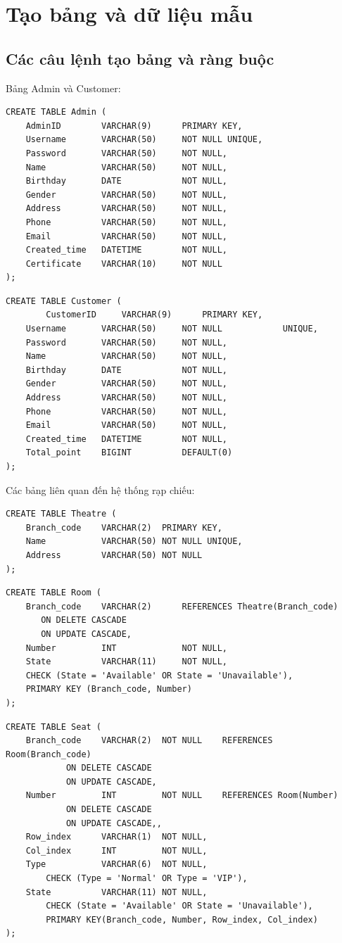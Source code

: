 \section{Tạo bảng và dữ liệu mẫu}
\subsection{Các câu lệnh tạo bảng và ràng buộc}
Bảng Admin và Customer:
\begin{verbatim}
CREATE TABLE Admin (
	AdminID        VARCHAR(9)      PRIMARY KEY,
	Username       VARCHAR(50)     NOT NULL	UNIQUE,
	Password       VARCHAR(50)     NOT NULL,
	Name           VARCHAR(50)     NOT NULL,
	Birthday       DATE            NOT NULL,
	Gender         VARCHAR(50)     NOT NULL,
	Address        VARCHAR(50)     NOT NULL,
	Phone          VARCHAR(50)     NOT NULL,
	Email          VARCHAR(50)     NOT NULL,
	Created_time   DATETIME        NOT NULL,
	Certificate    VARCHAR(10)     NOT NULL
);
\end{verbatim}
\begin{verbatim}
CREATE TABLE Customer (
        CustomerID     VARCHAR(9)      PRIMARY KEY,
	Username       VARCHAR(50)     NOT NULL            UNIQUE,
	Password       VARCHAR(50)     NOT NULL,
	Name           VARCHAR(50)     NOT NULL,
	Birthday       DATE            NOT NULL,
	Gender         VARCHAR(50)     NOT NULL,
	Address        VARCHAR(50)     NOT NULL,
	Phone          VARCHAR(50)     NOT NULL,
	Email          VARCHAR(50)     NOT NULL,
	Created_time   DATETIME        NOT NULL,
	Total_point    BIGINT          DEFAULT(0) 
);
\end{verbatim}
Các bảng liên quan đến hệ thống rạp chiếu:
\begin{verbatim}
CREATE TABLE Theatre (
	Branch_code    VARCHAR(2)  PRIMARY KEY,
	Name           VARCHAR(50) NOT NULL UNIQUE,
	Address        VARCHAR(50) NOT NULL
);
\end{verbatim}
\begin{verbatim}
CREATE TABLE Room (
	Branch_code    VARCHAR(2)      REFERENCES Theatre(Branch_code)
	   ON DELETE CASCADE
	   ON UPDATE CASCADE,
	Number         INT             NOT NULL,
	State          VARCHAR(11)     NOT NULL,
	CHECK (State = 'Available' OR State = 'Unavailable'),
	PRIMARY KEY (Branch_code, Number)
);
\end{verbatim}
\begin{verbatim}
CREATE TABLE Seat (
	Branch_code    VARCHAR(2)  NOT NULL    REFERENCES Room(Branch_code)
            ON DELETE CASCADE
            ON UPDATE CASCADE,
	Number         INT         NOT NULL    REFERENCES Room(Number)
            ON DELETE CASCADE
            ON UPDATE CASCADE,,
	Row_index      VARCHAR(1)  NOT NULL,
	Col_index      INT         NOT NULL,
	Type           VARCHAR(6)  NOT NULL,
        CHECK (Type = 'Normal' OR Type = 'VIP'),
	State          VARCHAR(11) NOT NULL, 
        CHECK (State = 'Available' OR State = 'Unavailable'), 
        PRIMARY KEY(Branch_code, Number, Row_index, Col_index)
);
\end{verbatim}
